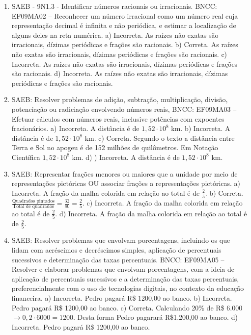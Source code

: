 \begin{enumerate}
\item
SAEB - 9N1.3 - Identificar números racionais ou irracionais. BNCC: EF09MA02 -- Reconhecer um número irracional como um número real cuja representação decimal é infinita e não periódica, e estimar a localização de alguns deles na reta numérica. a) Incorreta. As raízes não exatas são irracionais, dízimas periódicas e frações são racionais. b) Correta. As raízes não exatas são irracionais, dízimas periódicas e frações são racionais. c) Incorreta. As raízes não exatas são irracionais, dízimas periódicas e frações são racionais. d) Incorreta. As raízes não exatas são irracionais, dízimas periódicas e frações são racionais.

\item
SAEB: Resolver problemas de adição, subtração, multiplicação, divisão,
potenciação ou radiciação envolvendo números reais,
BNCC: EF09MA03 -- Efetuar cálculos com números reais, inclusive potências com
expoentes fracionários. 
a) Incorreta. A distância é de $1,52 \cdot 10^{8}$ km.  
b) Incorreta. A distância é de $1,52 \cdot 10^{8}$ km.  
c) Correta. Segundo o texto a distância entre Terra e Sol no apogeu é de 152 milhões de 
quilômetros. Em Notação Científica $1,52 \cdot 10^{8}$ km.
d) ) Incorreta. A distância é de $1,52 \cdot 10^{8}$ km.

\item
SAEB: Representar frações menores ou maiores que a unidade por
meio de representações pictóricas OU associar frações a representações
pictóricas.
a) Incorreta. A fração da malha colorida em relação ao total é de $\frac{2}{5}$. 
b) Correta. $\frac{\text{Quadrados\ pintados}}{\text{Total\ de\ quadrados}} = \frac{32}{80} = \frac{2}{5}$.
c) Incorreta. A fração da malha colorida em relação ao total é de $\frac{2}{5}$.
d) Incorreta. A fração da malha colorida em relação ao total é de $\frac{2}{5}$.

\item
SAEB: Resolver problemas que envolvam porcentagens, incluindo os
que lidam com acréscimos e decréscimos simples, aplicação de percentuais
sucessivos e determinação das taxas percentuais. 
BNCC: EF09MA05 -- Resolver e elaborar problemas que envolvam porcentagens, 
com a ideia de aplicação de percentuais sucessivos e a determinação das taxas
percentuais, preferencialmente com o uso de tecnologias digitais, no
contexto da educação financeira. 
a) Incorreta. Pedro pagará R\$ 1200,00 ao banco.
b) Incorreta. Pedro pagará R\$ 1200,00 ao banco.
c) Correta. Calculando 20\% de R\$ 6.000 $\rightarrow 0,2 \cdot 6000 =
1200$. Desta forma Pedro pagarará R\$1.200,00 ao banco.
d) Incorreta. Pedro pagará R\$ 1200,00 ao banco.


\end{enumerate}
